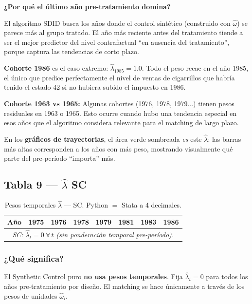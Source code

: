 \documentclass[11pt, a4paper]{article}
\begin{document}
\begin{interpretacion}
\textbf{¿Por qué el último año pre-tratamiento domina?}

El algoritmo SDID busca los años donde el control sintético (construido con
$\hat{\omega}$) se parece más al grupo tratado. El año más reciente antes del
tratamiento tiende a ser el mejor predictor del nivel contrafactual
``en ausencia del tratamiento'', porque captura las tendencias de corto plazo.

\medskip
\textbf{Cohorte 1986} es el caso extremo: $\hat{\lambda}_{1985}=1.0$.
Todo el peso recae en el año 1985, el único que predice perfectamente el nivel
de ventas de cigarrillos que habría tenido el estado 42 si no hubiera subido
el impuesto en 1986.

\medskip
\textbf{Cohorte 1963 vs 1965:} Algunas cohortes (1976, 1978, 1979...) tienen
pesos residuales en 1963 o 1965. Esto ocurre cuando hubo una tendencia especial
en esos años que el algoritmo considera relevante para el matching de largo plazo.

\medskip
En los \textbf{gráficos de trayectorias}, el área verde sombreada
\textit{es} este $\hat{\lambda}$: las barras más altas corresponden a los años
con más peso, mostrando visualmente qué parte del pre-período ``importa'' más.
\end{interpretacion}

\subsection{Tabla 9 — $\hat{\lambda}$ SC}

\begin{table}[H]
\centering
\caption{Pesos temporales $\hat{\lambda}$ --- SC. Python $=$ Stata a 4 decimales.}
\small
\begin{tabular}{rrrrrrrr}
\toprule
Año & 1975 & 1976 & 1978 & 1979 & 1981 & 1983 & 1986 \\
\midrule
\multicolumn{8}{c}{\textit{SC: $\hat{\lambda}_t = 0\ \forall\,t$ (sin ponderación temporal pre-período).}} \\
\bottomrule
\end{tabular}
\end{table}

\subsubsection*{¿Qué significa?}

El Synthetic Control puro \textbf{no usa pesos temporales}. Fija $\hat{\lambda}_t = 0$
para todos los años pre-tratamiento por diseño. El matching se hace únicamente
a través de los pesos de unidades $\hat{\omega}_i$.
\end{document}
